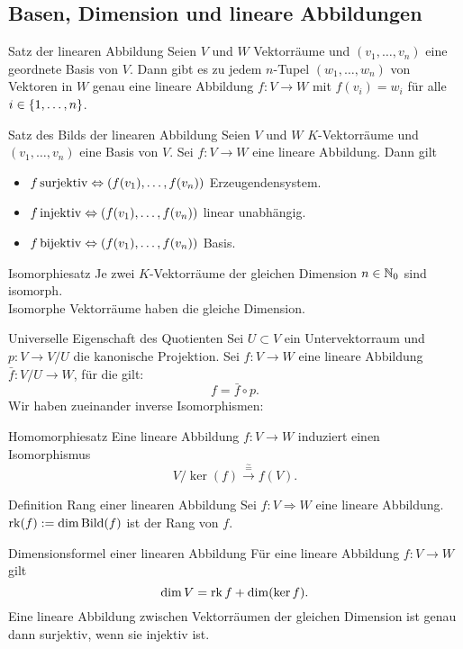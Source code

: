 \documentclass[main.tex]{subfiles}
\begin{document}
\subsection*{Basen, Dimension und lineare Abbildungen}
\begin{karte}{Satz der linearen Abbildung} %
    Seien \(V\) und \(W\) Vektorräume und \( (v_1,\ldots,v_n) \) 
    eine geordnete Basis von \(V\). Dann gibt es zu jedem 
    \(n\)-Tupel \((w_1,\ldots,w_n)\) von Vektoren in \(W\) 
    genau eine lineare Abbildung \( f: V \rightarrow W \) mit 
    \( f(v_i) = w_i \) für alle \( i \in \{1,\ldots,n\} \).
\end{karte}
\begin{karte}{Satz des Bilds der linearen Abbildung}%
    Seien \(V\) und \(W\) \(K\)-Vektorräume und 
    \((v_1,\ldots,v_n)\) eine Basis von \(V\). Sei 
    \( f : V \rightarrow W \) eine lineare Abbildung. Dann gilt 
    \begin{itemize}
        \item \( f \operatorname{surjektiv} \Leftrightarrow 
        (f(v_1),\ldots,f(v_n)) \) Erzeugendensystem.
        \item \( f \operatorname{injektiv} \Leftrightarrow 
        (f(v_1),\ldots,f(v_n)) \) linear unabhängig.
        \item \( f \operatorname{bijektiv} \Leftrightarrow
        (f(v_1),\ldots,f(v_n)) \) Basis.
    \end{itemize}
\end{karte}
\begin{karte}{Isomorphiesatz}
    Je zwei \(K\)-Vektorräume der gleichen Dimension 
    \( n \in \mathbb{N}_0 \) sind isomorph.\\
    Isomorphe Vektorräume haben die gleiche Dimension.
\end{karte}
\begin{karte}{Universelle Eigenschaft des Quotienten}
    Sei \( U \subset V \) ein Untervektorraum und 
    \( p : V \rightarrow V/U \) die kanonische Projektion. 
    Sei \( f: V \rightarrow W \) eine lineare Abbildung 
    \( \bar{f} : V/U \rightarrow W \), für die gilt:
    \[ f = \bar{f} \circ p. \]
    Wir haben zueinander inverse Isomorphismen:
\end{karte}
\begin{karte}{Homomorphiesatz}
    Eine lineare Abbildung \(f: V \rightarrow W\) 
    induziert einen Isomorphismus
    \[ V/\ker(f) \xrightarrow{\overset{\sim}{=}} f(V). \]
\end{karte}
\begin{karte}{Definition Rang einer linearen Abbildung}
    Sei \(f : V \Rightarrow W\) eine lineare Abbildung. 
    \(\operatorname{rk}(f) := \dim \operatorname{Bild}(f) \) ist der Rang von \(f\).
\end{karte}
\begin{karte}{Dimensionsformel einer linearen Abbildung}
    Für eine lineare Abbildung \( f: V \rightarrow W \) 
    gilt 
    \[ \dim V = \operatorname{rk} f + \dim(\ker f). \]
    Eine lineare Abbildung zwischen Vektorräumen 
    der gleichen Dimension ist genau dann surjektiv, wenn sie 
    injektiv ist.    
\end{karte}
\end{document}
